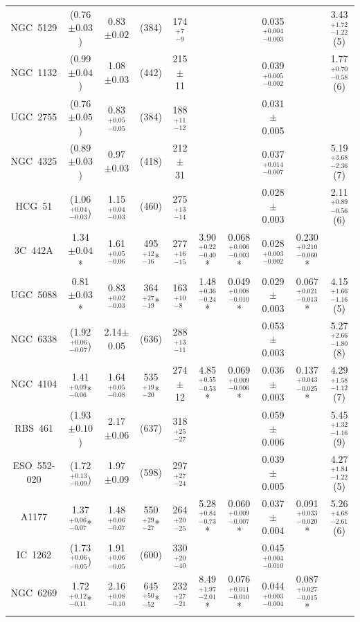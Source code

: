 \documentclass{aastex}
\begin{document}
\begin{table}
\begin{center}
{\begin{tabular}{cccccccccc}
NGC~5129 & (0.76$\pm0.03$) & 0.83$\pm0.02$ & (384) & 174$^{+7}_{-9}$ & & & 0.035$^{+0.004}_{-0.003}$  & & 3.43$^{+1.72}_{-1.22}$ (5) \\
NGC~1132 & (0.99$\pm0.04$) & 1.08$\pm0.03$ & (442) & 215$\pm$11 & & & 0.039$^{+0.005}_{-0.002}$ & & 1.77$^{+0.70}_{-0.58}$ (6) \\
UGC~2755 & (0.76$\pm0.05$) & 0.83$^{+0.05}_{-0.05}$ & (384) & 188$^{+11}_{-12}$ & & & 0.031$\pm$0.005 & & \\
NGC~4325 & (0.89$\pm0.03$) & 0.97$\pm0.03$ & (418) & 212$\pm$31 & & & 0.037$^{+0.014}_{-0.007}$ & & 5.19$^{+3.68}_{-2.36}$ (7) \\
HCG~51   & (1.06$^{+0.04}_{-0.03}$) & 1.15$^{+0.04}_{-0.03}$ & (460) & 275$^{+13}_{-14}$ & & & 0.028$\pm$0.003 & & 2.11$^{+0.89}_{-0.56}$ (6) \\
3C~442A  & 1.34$\pm0.04$* & 1.61$^{+0.05}_{-0.06}$ & 495$^{+12}_{-16}$* & 277$^{+16}_{-15}$ & 3.90$^{+0.22}_{-0.40}$* & 0.068$^{+0.006}_{-0.003}$* & 0.028$^{+0.003}_{-0.002}$ & 0.230$^{+0.210}_{-0.060}$* & \\
UGC~5088 & 0.81$\pm0.03$* & 0.83$^{+0.02}_{-0.03}$ & 364$^{+27}_{-19}$* & 163$^{+10}_{-8}$ & 1.48$^{+0.36}_{-0.24}$* & 0.049$^{+0.008}_{-0.010}$* & 0.029$\pm$0.003 & 0.067$^{+0.021}_{-0.013}$* & 4.15$^{+1.66}_{-1.16}$ (5) \\
NGC~6338 & (1.92$^{+0.06}_{-0.07}$) & 2.14$\pm$0.05 & (636) & 288$^{+13}_{-11}$ & & & 0.053$\pm$0.003 & & 5.27$^{+2.66}_{-1.80}$ (8) \\
NGC~4104 & 1.41$^{+0.09}_{-0.06}$* & 1.64$^{+0.05}_{-0.08}$ & 535$^{+19}_{-20}$* & 274$\pm$12 & 4.85$^{+0.55}_{-0.53}$* & 0.069$^{+0.009}_{-0.006}$* & 0.036$\pm$0.003 & 0.137$^{+0.043}_{-0.025}$* & 4.29$^{+1.58}_{-1.12}$ (7) \\
RBS~461  & (1.93$\pm0.10$) & 2.17$\pm0.06$ & (637) & 318$^{+25}_{-27}$ & & & 0.059$\pm$0.006 & & 5.45$^{+1.32}_{-1.16}$ (9) \\
ESO~552-020 & (1.72$^{+0.13}_{-0.09}$) & 1.97$\pm0.09$ & (598) & 297$^{+27}_{-24}$ & & & 0.039$\pm$0.005 & & 4.27$^{+1.84}_{-1.22}$ (5) \\
A1177    & 1.37$^{+0.06}_{-0.07}$* & 1.48$^{+0.06}_{-0.07}$ & 550$^{+29}_{-27}$* & 264$^{+20}_{-25}$ & 5.28$^{+0.84}_{-0.73}$* & 0.060$^{+0.009}_{-0.007}$* & 0.037$\pm$0.004 & 0.091$^{+0.033}_{-0.020}$* & 5.26$^{+4.68}_{-2.61}$ (6)  \\
IC~1262  & (1.73$^{+0.06}_{-0.05}$) & 1.91$^{+0.06}_{-0.05}$ & (600) & 330$^{+20}_{-40}$ & & & 0.045$^{+0.004}_{-0.010}$ & & \\
NGC~6269 & 1.72$^{+0.12}_{-0.11}$* & 2.16$^{+0.08}_{-0.10}$ & 645$^{+50}_{-52}$* & 232$^{+27}_{-21}$ & 8.49$^{+1.97}_{-2.01}$* & 0.076$^{+0.011}_{-0.010}$* & 0.044$^{+0.003}_{-0.004}$ & 0.087$^{+0.027}_{-0.015}$* & \\

\end{tabular}}
\end{center}
\end{table}
\end{document}
